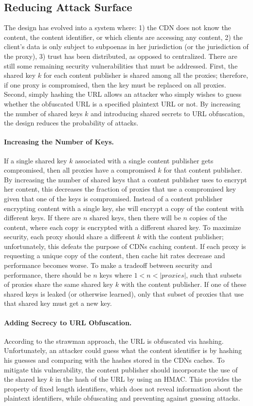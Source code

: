 \subsection{Reducing Attack Surface}
The design has evolved into a system where: 1) the CDN does not know the content, the content identifier, 
or which clients are accessing any content, 2) the client's data is only subject to subpoenas in her jurisdiction 
(or the jurisdiction of the proxy), 3) trust has been distributed, as opposed to centralized.  There are still 
some remaining security vulnerabilities that must be addressed.  First, the shared key $k$ for each content 
publisher is shared among all the proxies; therefore, if one proxy is compromised, then the key must be replaced 
on all proxies.  Second, simply hashing the URL allows an attacker who simply 
wishes to guess whether the obfuscated URL is a specified plaintext URL or not.  By increasing the number of shared 
keys $k$ and introducing shared secrets to URL obfuscation, the design reduces the probability of attacks.

\paragraph{Increasing the Number of Keys.} If a single shared key $k$ associated with a single content publisher gets 
compromised, then all proxies have a compromised $k$ for that content publisher.  By increasing the number of shared 
keys that a content publisher uses to encrypt her content, this decreases the fraction of proxies that use a 
compromised key given that one of the keys is compromised.  Instead of a content publisher encrypting content with a 
single key, she will encrypt a copy of the content with different keys.  If there are $n$ shared keys, then there 
will be $n$ copies of the content, where each copy is encrypted with a different shared key.  To maximize security, each proxy should share a
different $k$ with the content publisher; unfortunately, this defeats the purpose of CDNs caching content.  If each 
proxy is requesting a unique copy of the content, then cache hit rates decrease and performance becomes worse.  To make 
a tradeoff between security and performance, there should be $n$ keys where $1 < n < |proxies|$, such that subsets of 
proxies share the same shared key $k$ with the content publisher.  If one of these shared keys is leaked (or otherwise learned), only that 
subset of proxies that use that shared key must get a new key.  

\paragraph{Adding Secrecy to URL Obfuscation.} According to the strawman approach, the URL is obfuscated via hashing.  Unfortunately, 
an attacker could guess what the content identifier is by hashing his guesses and comparing with the hashes stored in the 
CDNs caches.  To mitigate this vulnerability, the content publisher should incorporate the use of the shared key $k$ in the 
hash of the URL by using an HMAC.  This provides the property of fixed length identifiers, which does not reveal information about 
the plaintext identifiers, while obfuscating and preventing 
against guessing attacks.  

